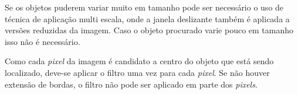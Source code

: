 Se os objetos puderem variar muito em tamanho pode ser necessário o uso de
técnica de aplicação multi escala, onde a janela deslizante também é aplicada a
versões reduzidas da imagem. Caso o objeto procurado varie pouco em tamanho
isso não é necessário.

Como cada \emph{pixel} da imagem é candidato a centro do objeto que está sendo
localizado, deve-se aplicar o filtro uma vez para cada \emph{pixel}. Se não
houver extensão de bordas, o filtro não pode ser aplicado em parte dos
\emph{pixels}.

